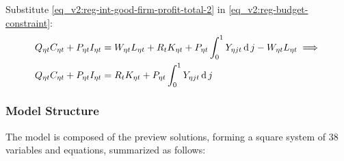 \documentclass[../thesis.tex]{subfiles}
\begin{document}
Substitute \ref{eq_v2:reg-int-good-firm-profit-total-2} in \ref{eq_v2:reg-budget-constraint}:
\begin{align}
	& Q_{\eta t} C_{\eta t} + P_{\eta t} I_{\eta t} = W_{\eta t} L_{\eta t} + R_{t} K_{\eta t} + P_{\eta t} \int_{0}^{1} Y_{\eta jt} \operatorname{d} j - W_{\eta t} L_{\eta t} \implies \nonumber \\
	& Q_{\eta t} C_{\eta t} + P_{\eta t} I_{\eta t} = R_{t} K_{\eta t} + P_{\eta t} \int_{0}^{1} Y_{\eta jt} \operatorname{d} j \label{eq_v2:reg-budget-constraint-3}
\end{align}
 

\begin{comment}

\begin{align}
	& \text{where:} \quad Y_{\eta t} = C_{\eta 1 t} + C_{\eta 2 t} + I_{\eta t} %
	L_{\eta t} &= \int_{0}^{1} L_{\eta jt} \dif j %
\end{align}

\end{comment}

\newpage


\subsubsection{Model Structure}

The model is composed of the preview solutions, forming a square system of 38 variables and equations, summarized as follows:
\end{document}
